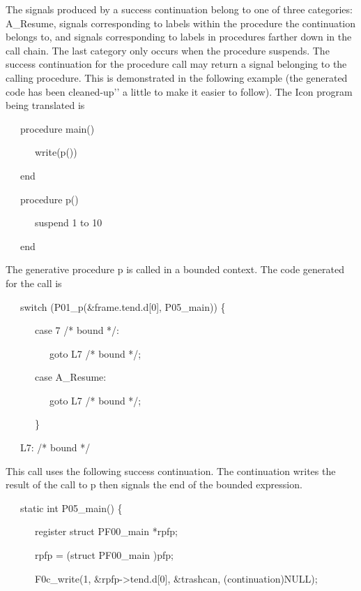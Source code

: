 The signals produced by a success continuation belong to one of three
categories: A\_Resume, signals corresponding to labels within the
procedure the continuation belongs to, and signals corresponding to
labels in procedures farther down in the call chain. The last category
only occurs when the procedure suspends. The success continuation for
the procedure call may return a signal belonging to the calling
procedure. This is demonstrated in the following example (the
generated code has been
{\textasciigrave}{\textasciigrave}cleaned-up'{}' a little to make it
easier to follow).  The Icon program being translated is

{\ttfamily\mdseries
\ \ \ procedure main()}

{\ttfamily\mdseries
\ \ \ \ \ \ write(p())}

{\ttfamily\mdseries
\ \ \ end}

{\ttfamily\mdseries
\ \ \ procedure p()}

{\ttfamily\mdseries
\ \ \ \ \ \ suspend 1 to 10}

{\ttfamily\mdseries
\ \ \ end}


The generative procedure p is called in a bounded context. The code
generated for the call is

{\ttfamily\mdseries
\ \ \ switch (P01\_p(\&frame.tend.d[0], P05\_main)) \{}

{\ttfamily\mdseries
\ \ \ \ \ \ case 7 /* bound */:}

{\ttfamily\mdseries
\ \ \ \ \ \ \ \ \ goto L7 /* bound */;}

{\ttfamily\mdseries
\ \ \ \ \ \ case A\_Resume:}

{\ttfamily\mdseries
\ \ \ \ \ \ \ \ \ goto L7 /* bound */;}

{\ttfamily\mdseries
\ \ \ \ \ \ \}}

{\ttfamily\mdseries
\ \ \ L7: /* bound */}


This call uses the following success continuation. The continuation
writes the result of the call to p then signals the end of the bounded
expression.

{\ttfamily\mdseries
\ \ \ static int P05\_main() \{}

{\ttfamily\mdseries
\ \ \ \ \ \ register struct PF00\_main *rpfp;}


\bigskip

{\ttfamily\mdseries
\ \ \ \ \ \ rpfp = (struct PF00\_main )pfp;}

{\ttfamily\mdseries
\ \ \ \ \ \ F0c\_write(1, \&rpfp-{\textgreater}tend.d[0], \&trashcan, (continuation)NULL);}

